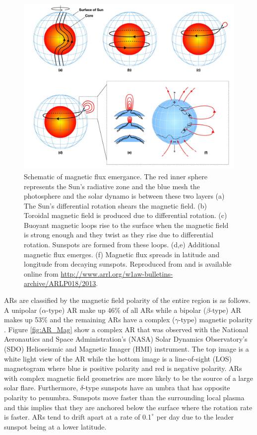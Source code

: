 	\begin{figure}
		\centering
		\includegraphics[width=\textwidth]{dynamo.pdf}
		\caption{
				 Schematic of magnetic flux emergance.
				 The red inner sphere represents the Sun's radiative zone and the blue mesh the photosphere and the solar dynamo is between these two layers
				 (a) The Sun's differential rotation shears the magnetic field.
				 (b) Toroidal magnetic field is produced due to differential rotation.
				 (c) Buoyant magnetic loops rise to the surface when the magnetic field is strong enough and they twist as they rise due to differential rotation.
				 Sunspots are formed from these loops.
				 (d,e) Additional magnetic flux emerges. 
				 (f) Magnetic flux spreads in latitude and longitude from decaying sunspots.
			     Reproduced from \cite{1367-2630-9-8-297} and is available online from \url{http://www.arrl.org/w1aw-bulletins-archive/ARLP018/2013}.
		        }
		\label{fig:dynamo_field}
	\end{figure}
			
	ARs are classified by the magnetic field polarity of the entire region is as follows.
	A unipolar ($\alpha$-type) AR make up 46\% of all ARs while a bipolar ($\beta$-type) AR makes up 53\% and the remaining ARs have a complex ($\gamma$-type) magnetic polarity \citep{2014masu.book.....P}.
	Figure \ref{fig:AR_Mag} show a complex AR that was observed with the National Aeronautics and Space Administration's (NASA) Solar Dynamics Observatory's (SDO) Helioseismic and Magnetic Imager (HMI) instrument.
	The top image is a white light view of the AR while the bottom image is a line-of-sight (LOS) magnetogram where blue is positive polarity and red is negative polarity.
	ARs with complex magnetic field geometries are more likely to be the source of a large solar flare.
	Furthermore, $\delta$-type sunspots have an umbra that has opposite polarity to penumbra.
	Sunspots move faster than the surrounding local plasma and this implies that they are anchored below the surface where the rotation rate is faster.
	ARs tend to drift apart at a rate of 0.1$^\degree$ per day due to the leader sunspot being at a lower latitude.
	
